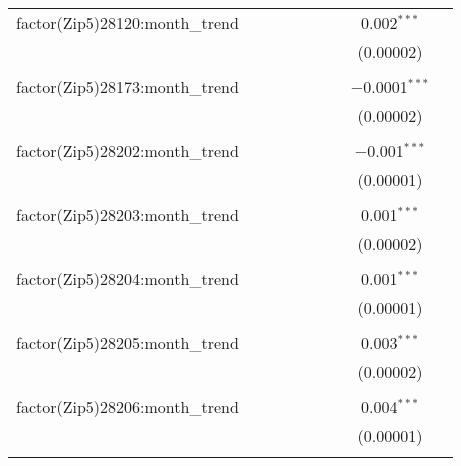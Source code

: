 \begin{table}[H]
{\begin{tabular}{@{\extracolsep{5pt}}lcccccccc}
  factor(Zip5)28120:month\_trend &  &  &  &  &  &  & 0.002$^{***}$ &  \\  

   &  &  &  &  &  &  & (0.00002) &  \\  

   & & & & & & & & \\  

  factor(Zip5)28173:month\_trend &  &  &  &  &  &  & $-$0.0001$^{***}$ &  \\  

   &  &  &  &  &  &  & (0.00002) &  \\  

   & & & & & & & & \\  

  factor(Zip5)28202:month\_trend &  &  &  &  &  &  & $-$0.001$^{***}$ &  \\  

   &  &  &  &  &  &  & (0.00001) &  \\  

   & & & & & & & & \\  

  factor(Zip5)28203:month\_trend &  &  &  &  &  &  & 0.001$^{***}$ &  \\  

   &  &  &  &  &  &  & (0.00002) &  \\  

   & & & & & & & & \\  

  factor(Zip5)28204:month\_trend &  &  &  &  &  &  & 0.001$^{***}$ &  \\  

   &  &  &  &  &  &  & (0.00001) &  \\  

   & & & & & & & & \\  

  factor(Zip5)28205:month\_trend &  &  &  &  &  &  & 0.003$^{***}$ &  \\  

   &  &  &  &  &  &  & (0.00002) &  \\  

   & & & & & & & & \\  

  factor(Zip5)28206:month\_trend &  &  &  &  &  &  & 0.004$^{***}$ &  \\  

   &  &  &  &  &  &  & (0.00001) &  \\  

   & & & & & & & & \\  


\end{tabular}}
\end{table}

